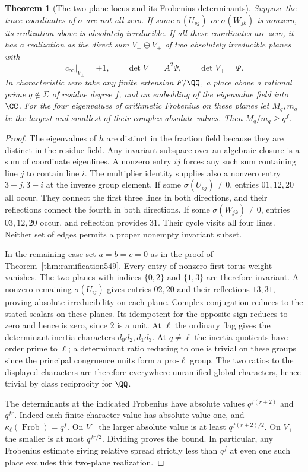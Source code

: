 \documentclass[a4paper,11pt]{article}
\newtheorem{theorem}[proposition]{Theorem}
\theoremstyle{definition}
\theoremstyle{remark}
\numberwithin{equation}{section}
\begin{document}
\begin{theorem}[The two-plane locus and its Frobenius determinants]
\leavevmode\label{thm:purityblocks549}
Suppose the trace coordinates of \(\sigma\) are not all zero.
If some \(\sigma(U_{pj})\) or \(\sigma(W_{jk})\) is nonzero, its
realization above is absolutely irreducible. If all these coordinates
are zero, it has a realization as the direct sum \(V_-\oplus V_+\)
of two absolutely irreducible planes with
\[
 c_\infty|_{V_\pm}=\pm1,\qquad
 \det V_-=A^2\Psi,\qquad \det V_+=\Psi .
\]
In characteristic zero take any finite extension \(F/\QQ\), a
place above a rational prime \(q\notin\Sigma\) of residue degree
\(f\), and an embedding of the eigenvalue field into \(\CC\).
For the four eigenvalues of arithmetic Frobenius on these planes
let \(M_q,m_q\) be the largest and smallest of their complex
absolute values. Then \(M_q/m_q\ge q^f\).
\end{theorem}
\begin{proof}
The eigenvalues of \(h\) are distinct in the fraction field
because they are distinct in the residue field. Any invariant
subspace over an algebraic closure is a sum of coordinate
eigenlines. A nonzero entry \(ij\) forces any such sum containing
line \(j\) to contain line \(i\). The multiplier identity supplies
also a nonzero entry \(3-j,3-i\) at the inverse group element.
If some \(\sigma(U_{pj})\ne0\), entries \(01,12,20\) all occur.
They connect the first three lines in both directions, and their
reflections connect the fourth in both directions. If some
\(\sigma(W_{jk})\ne0\), entries \(03,12,20\) occur, and reflection
provides \(31\). Their cycle visits all four lines. Neither set
of edges permits a proper nonempty invariant subset.

In the remaining case set \(a=b=c=0\) as in the proof of
Theorem~\ref{thm:ramification549}. Every entry of nonzero first
torus weight vanishes. The two planes with indices \(\{0,2\}\)
and \(\{1,3\}\) are therefore invariant. A nonzero remaining
\(\sigma(U_{ij})\) gives entries \(02,20\) and their reflections
\(13,31\), proving absolute irreducibility on each plane.
Complex conjugation reduces to the stated scalars on these
planes. Its idempotent for the opposite sign reduces to zero
and hence is zero, since 2 is a unit. At \(\ell\) the ordinary
flag gives the determinant inertia characters \(d_0d_2,d_1d_3\).
At \(q\ne\ell\) the inertia quotients have order prime to
\(\ell\); a determinant ratio reducing to one is trivial on
these groups since the principal congruence units form a
pro-\(\ell\) group. The two ratios to the displayed characters
are therefore everywhere unramified global characters, hence
trivial by class reciprocity for \(\QQ\).

The determinants at the indicated Frobenius have absolute values
\(q^{f(r+2)}\) and \(q^{fr}\). Indeed each finite character
value has absolute value one, and
\(\kappa_\ell(\operatorname{Frob})=q^f\). On \(V_-\) the larger
absolute value is at least \(q^{f(r+2)/2}\). On \(V_+\) the
smaller is at most \(q^{fr/2}\). Dividing proves the bound.
In particular, any Frobenius estimate giving relative spread
strictly less than \(q^f\) at even one such place excludes
this two-plane realization.
\end{proof}
\end{document}
